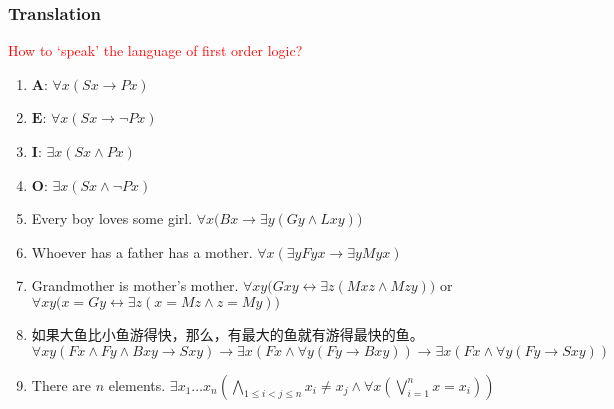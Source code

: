 \documentclass[UTF8,aspectratio=43,11pt,colorlinks,compress,openany]{beamer}%
\begin{document}
\begin{frame}\frametitle{Translation}
		\begin{block}{}
			\centering\textcolor{red}{How to `speak' the language of first order logic?}
		\end{block}
		\begin{enumerate}
			\item $\mathbf{A}$: $\forall x(Sx\to Px)$
			\item $\mathbf{E}$: $\forall x(Sx\to \neg Px)$
			\item $\mathbf{I}$: $\exists x(Sx\wedge Px)$
			\item $\mathbf{O}$: $\exists x(Sx\wedge \neg Px)$
			\item Every boy loves some girl. $\forall x\big(Bx\to\exists y(Gy\wedge Lxy)\big)$
			\item Whoever has a father has a mother. $\forall x(\exists y Fyx\to\exists y Myx)$
			\item Grandmother is mother's mother.
			$\forall xy\big(Gxy\leftrightarrow\exists z(Mxz\wedge Mzy)\big)$ or
			$\forall xy\big(x=Gy\leftrightarrow\exists z(x=Mz\wedge z=My)\big)$
			\item 如果大鱼比小鱼游得快，那么，有最大的鱼就有游得最快的鱼。\\
			$\forall xy(Fx\wedge Fy\wedge Bxy\to Sxy)\to\exists x(Fx\wedge\forall y(Fy\to Bxy))\to\exists x(Fx\wedge\forall y(Fy\to Sxy))$
			\item There are $n$ elements.
			$\exists x_1\dots x_n\left(\bigwedge\limits_{1\leq i<j\leq n}x_i\ne x_j\wedge\forall x\left(\bigvee\limits_{i=1}^n x=x_i\right)\right)$
		\end{enumerate}
\end{frame}
\end{document}
